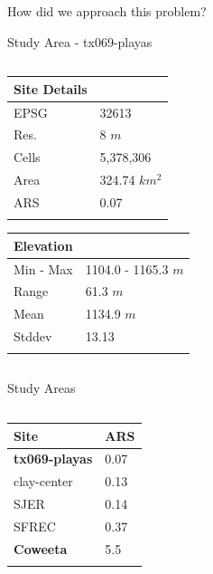 \documentclass[
  ignorenonframetext,
]{beamer}
\begin{document}
\begin{frame}[fragile]{How did we approach this problem?}
\begin{block}{Study Area - tx069-playas}
\begin{columns}[T]
\begin{column}{0.5\textwidth}
\begin{longtable}[]{@{}ll@{}}
\toprule\noalign{}
Site Details & \\
\midrule\noalign{}
\endhead
EPSG & 32613 \\
Res. & 8 \(m\) \\
Cells & 5,378,306 \\
Area & 324.74 \(km^2\) \\
ARS & 0.07 \\
\bottomrule\noalign{}
\end{longtable}

\begin{longtable}[]{@{}ll@{}}
\toprule\noalign{}
Elevation & \\
\midrule\noalign{}
\endhead
Min - Max & 1104.0 - 1165.3 \(m\) \\
Range & 61.3 \(m\) \\
Mean & 1134.9 \(m\) \\
Stddev & 13.13 \\
\bottomrule\noalign{}
\end{longtable}
\end{column}
\end{columns}
\end{block}

\begin{block}{Study Areas}
\label{study-areas}
\begin{columns}[T]
\begin{column}{0.4\textwidth}
\begin{longtable}[]{@{}ll@{}}
\toprule\noalign{}
Site & ARS \\
\midrule\noalign{}
\endhead
\textbf{tx069-playas} & 0.07 \\
clay-center & 0.13 \\
SJER & 0.14 \\
SFREC & 0.37 \\
\textbf{Coweeta} & 5.5 \\
\bottomrule\noalign{}
\end{longtable}
\end{column}

\begin{column}{0.6\textwidth}
\begin{figure}[H]


\end{figure}
\end{column}
\end{columns}
\end{block}
\end{frame}
\end{document}
